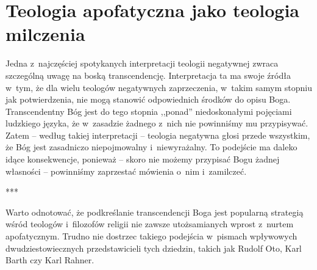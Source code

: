 

\chapter{Teologia apofatyczna jako teologia milczenia}




Jedna z~najczęściej spotykanych interpretacji teologii negatywnej zwraca szczególną uwagę na boską transcendencję. Interpretacja ta ma swoje źródła w~tym, że dla wielu teologów negatywnych zaprzeczenia, w~takim samym stopniu jak potwierdzenia, nie mogą stanowić odpowiednich środków do opisu Boga. Transcendentny Bóg jest do tego stopnia ,,ponad'' niedoskonałymi pojęciami ludzkiego języka, że w~zasadzie żadnego z~nich nie powinniśmy mu przypisywać. Zatem -- według takiej interpretacji -- teologia negatywna głosi przede wszystkim, że Bóg jest zasadniczo niepojmowalny i~niewyrażalny. To podejście ma daleko idące konsekwencje, ponieważ -- skoro nie możemy przypisać Bogu żadnej własności -- powinniśmy zaprzestać mówienia o~nim i~zamilczeć.

***

Warto odnotować, że podkreślanie transcendencji Boga jest popularną strategią wśród teologów i~filozofów religii nie zawsze utożsamianych wprost z~nurtem apofatycznym. Trudno nie dostrzec takiego podejścia w~pismach wpływowych dwudziestowiecznych przedstawicieli tych dziedzin, takich jak Rudolf Oto, Karl Barth czy Karl Rahner.


